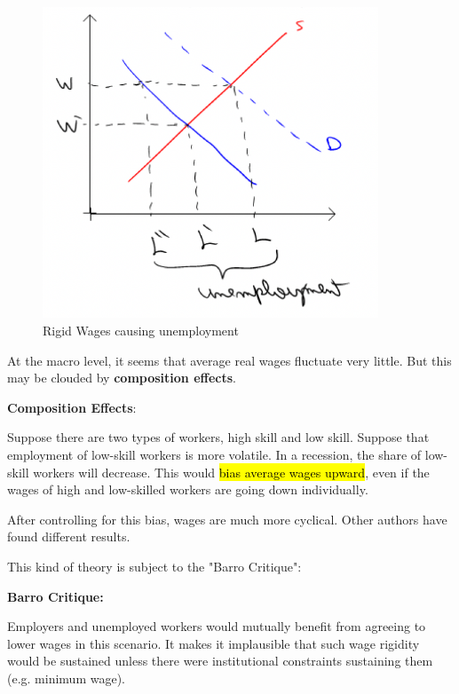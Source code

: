 \documentclass[11pt]{article}
\begin{document}
\begin{figure}[h]
    \centering
    \includegraphics[width=10cm]{photos/rigid wages.png}
    \caption{Rigid Wages causing unemployment}
    \label{fig:rigid wages}
\end{figure}

At the macro level, it seems that average real wages fluctuate very little. But this may be clouded by \textbf{composition effects}.

\begin{intu}
        \textbf{Composition Effects}:

    Suppose there are two types of workers, high skill and low skill. Suppose that employment of low-skill workers is more volatile. In a recession, the share of low-skill workers will decrease. This would \hl{bias average wages upward}, even if the wages of high and low-skilled workers are going down individually.
\end{intu}

After controlling for this bias, wages are much more cyclical. Other authors have found different results.

This kind of theory is subject to the "Barro Critique":

\begin{definition}
    \textbf{Barro Critique:}

    Employers and unemployed workers would mutually benefit from agreeing to lower wages in this scenario. It makes it implausible that such wage rigidity would be sustained unless there were institutional constraints sustaining them (e.g. minimum wage).
\end{definition}
\end{document}
